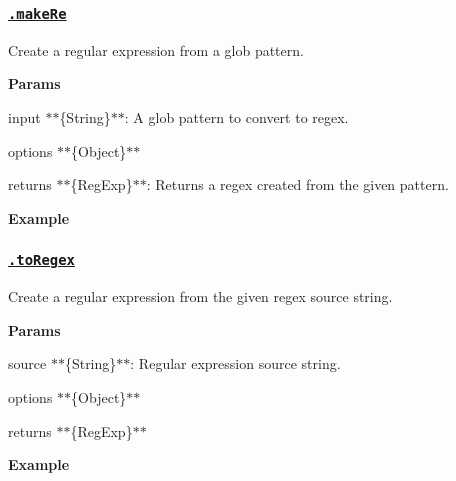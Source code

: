\subsubsection*{\href{lib/picomatch.js#L233}{\tt .make\+Re}}

Create a regular expression from a glob pattern.

{\bfseries Params}


\begin{DoxyItemize}
\item {\ttfamily input} $\ast$$\ast$\{String\}$\ast$$\ast$\+: A glob pattern to convert to regex.
\item {\ttfamily options} $\ast$$\ast$\{Object\}$\ast$$\ast$
\item {\ttfamily returns} $\ast$$\ast$\{Reg\+Exp\}$\ast$$\ast$\+: Returns a regex created from the given pattern.
\end{DoxyItemize}

{\bfseries Example}




\subsubsection*{\href{lib/picomatch.js#L294}{\tt .to\+Regex}}

Create a regular expression from the given regex source string.

{\bfseries Params}


\begin{DoxyItemize}
\item {\ttfamily source} $\ast$$\ast$\{String\}$\ast$$\ast$\+: Regular expression source string.
\item {\ttfamily options} $\ast$$\ast$\{Object\}$\ast$$\ast$
\item {\ttfamily returns} $\ast$$\ast$\{Reg\+Exp\}$\ast$$\ast$
\end{DoxyItemize}

{\bfseries Example}





